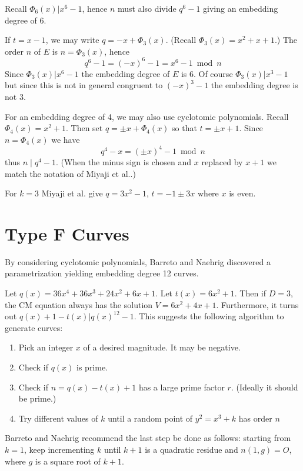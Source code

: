 Recall $\Phi_6(x) | x^6 - 1$, hence $n$ must also divide $q^6 - 1$
giving an embedding degree of 6.

If $t = x - 1$, we may write $q = -x + \Phi_3(x)$.
(Recall $\Phi_3(x) = x^2 + x + 1$.)
The order $n$ of $E$ is $n = \Phi_3(x)$, hence
\[ q^6 - 1 = (-x)^6 - 1 = x^6 - 1 \bmod n \]
Since $\Phi_3(x) | x^6 - 1$ the embedding degree of $E$ is 6.
Of course $\Phi_3(x) | x^3 - 1$ but since this is not in general
congruent to $(-x)^3 - 1$ the embedding degree is not 3.

For an embedding degree of 4, we may also use cyclotomic polynomials.
Recall $\Phi_4(x) = x^2 + 1$. Then set $q = \pm x + \Phi_4(x)$
so that $t = \pm x + 1$. Since $n = \Phi_4(x)$ we have
\[ q^4 - x = (\pm x)^4 - 1 \bmod n \]
thus $n \mid q^4 - 1$.
(When the minus sign is chosen and $x$ replaced by $x+1$ 
we match the notation of Miyaji et al.\cite{mnt}.)

For $k=3$ Miyaji et al. give $q = 3 x^2 - 1$, $t = -1 \pm 3x$ where $x$ is
even.

\section {Type F Curves}

By considering cyclotomic polynomials,
Barreto and Naehrig discovered a parametrization yielding embedding
degree 12 curves.

Let $q(x) = 36x^4 + 36x^3 + 24x^2 + 6x + 1$. Let $t(x) = 6x^2 + 1$.
Then if $D = 3$, the CM equation always has the solution
$V = 6x^2 + 4x + 1$. Furthermore,
it turns out $q(x) + 1 - t(x) | q(x)^{12} - 1$.
This suggests the following algorithm to generate curves:

\begin{enumerate}
\item
Pick an integer $x$ of a desired magnitude. It may be negative.
\item
Check if $q(x)$ is prime.
\item
Check if $n = q(x) - t(x) + 1$ has a large prime factor $r$.
(Ideally it should be prime.)
\item
Try different values of $k$ until a random point of
$y^2 = x^3 + k$ has order $n$
\end{enumerate}

Barreto and Naehrig recommend the last step be done as follows:
starting from $k = 1$, keep incrementing $k$ until $k+1$ is a quadratic
residue and $n(1,g) = O$, where $g$ is a square root of $k + 1$.

